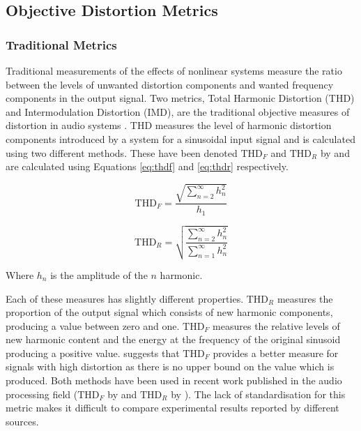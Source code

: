 	\subsection{Objective Distortion Metrics}
	\label{sec:Excitation-Analysis-Metrics}
		\subsubsection*{Traditional Metrics}
			Traditional measurements of the effects of nonlinear systems measure the ratio between the levels of
			unwanted distortion components and wanted frequency components in the output signal. Two metrics,
			Total Harmonic Distortion (THD) and Intermodulation Distortion (IMD), are the traditional objective
			measures of distortion in audio systems \citep{czerwinski2001multitone1}. THD measures the level of
			harmonic distortion components introduced by a system for a sinusoidal input signal and is
			calculated using two different methods. These have been denoted $\mathrm{THD}_{F}$ and
			$\mathrm{THD}_{R}$ by \citet{shmilovitz2005on} and are calculated using Equations \ref{eq:thdf} and
			\ref{eq:thdr} respectively.

			\begin{equation}
				\mathrm{THD}_{F} = \frac{\sqrt{\sum_{n = 2}^{\infty} h_{n}^{2}}}{h_{1}}
				\label{eq:thdf}
			\end{equation}

			\begin{equation}
				\mathrm{THD}_{R} = \sqrt{\frac{\sum_{n = 2}^{\infty} h_{n}^{2}}
								       {\sum_{n = 1}^{\infty} h_{n}^{2}}}
				\label{eq:thdr}
			\end{equation}

			Where $h_n$ is the amplitude of the $n$ harmonic. 

			Each of these measures has slightly different properties. $\mathrm{THD}_{R}$ measures the proportion
			of the output signal which consists of new harmonic components, producing a value between zero and
			one.  $\mathrm{THD}_{F}$ measures the relative levels of new harmonic content and the energy at the
			frequency of the original sinusoid producing a positive value. \citet{shmilovitz2005on} suggests
			that $\mathrm{THD}_{F}$ provides a better measure for signals with high distortion as there is no
			upper bound on the value which is produced.  Both methods have been used in recent work published in
			the audio processing field ($\mathrm{THD}_{F}$ by \citet{fleischmann2014a} and $\mathrm{THD}_{R}$ by
			\citet{dutilleux2011nonlinear}).  The lack of standardisation for this metric makes it difficult to
			compare experimental results reported by different sources.

